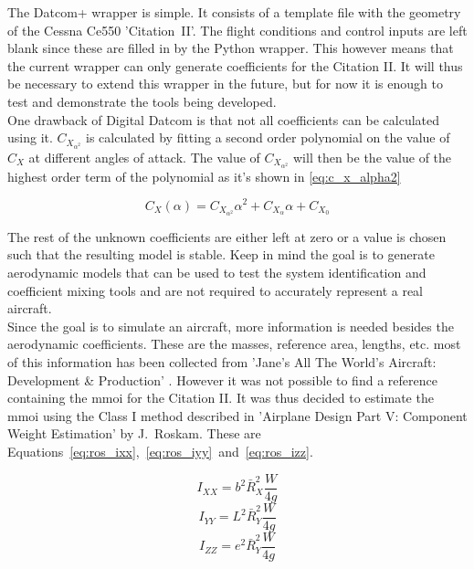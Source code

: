 The Datcom+ wrapper is simple. It consists of a template file with the geometry of the Cessna Ce550 'Citation~II'. The flight conditions and control inputs are left blank since these are filled in by the Python wrapper. This however means that the current wrapper can only generate coefficients for the Citation II. It will thus be necessary to extend this wrapper in the future, but for now it is enough to test and demonstrate the tools being developed.\\

One drawback of Digital Datcom is that not all coefficients can be calculated using it. $C_{X_{\alpha^2}}$ is calculated by fitting a second order polynomial on the value of $C_X$ at different angles of attack. The value of $C_{X_{\alpha^2}}$ will then be the value of the highest order term of the polynomial as it's shown in \autoref{eq:c_x_alpha2}

\begin{equation}
\label{eq:c_x_alpha2}
{C_X}(\alpha ) = {C_{X_{\alpha ^2}}}{\alpha ^2} + {C_{{X_\alpha }}}\alpha  + {C_{{X_0}}}
\end{equation}
 
The rest of the unknown coefficients are either left at zero or a value is chosen such that the resulting model is stable. Keep in mind the goal is to generate aerodynamic models that can be used to test the system identification and coefficient mixing tools and are not required to accurately represent a real aircraft. \\

Since the goal is to simulate an aircraft, more information is needed besides the aerodynamic coefficients. These are the masses, reference area, lengths, etc. most of this information has been collected from 'Jane's All The World's Aircraft: Development \& Production' \cite{janes}. However it was not possible to find a reference containing the \gls{mmoi} for the Citation II. It was thus decided to estimate the \gls{mmoi} using the Class I method described in 'Airplane Design Part V: Component Weight Estimation' by J.~Roskam\cite{roskam_5}. These are Equations~\ref{eq:ros_ixx},~\ref{eq:ros_iyy}~and~\ref{eq:ros_izz}.


\begin{equation}
    \label{eq:ros_ixx}
    {I_{XX}} = {b^2}\bar R_X^2\frac{W}{{4g}}
\end{equation}
\begin{equation}
    \label{eq:ros_iyy}
    {I_{YY}} = {L^2}\bar R_Y^2\frac{W}{{4g}}
\end{equation}
\begin{equation}
    \label{eq:ros_izz}
    {I_{ZZ}} = {e^2}\bar R_Y^2\frac{W}{{4g}}
\end{equation}

